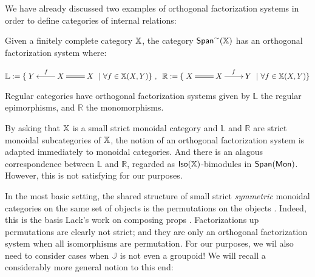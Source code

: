 We have already discussed two examples of orthogonal factorization systems in order to define categories of internal relations:

\begin{example}
Given a finitely complete category $\mathbb{X}$, the category $\mathsf{Span}^\sim(\mathbb{X})$ has an orthogonal factorization system where:

$$\mathbb{L}:=
\{\xymatrix{Y & X \ar@{=}[r] \ar[l]_{f } & X}    \  | \ \forall f \in \X(X,Y)  \}\ , \hspace*{.2cm}
\mathbb{R}:=
\{ \xymatrix{X & X \ar@{=}[l] \ar[r]^{f } & Y}    \  | \ \forall f \in \X(X,Y) \}
$$

\end{example}


\begin{example}
Regular categories have orthogonal factorization systems given by $\mathbb{L}$ the regular epimorphisms, and $\mathbb R$ the monomorphisms.
\end{example}



By asking that $\mathbb{X}$ is a small strict monoidal category and  $\mathbb{L}$ and $\mathbb{R}$ are strict monoidal subcategories of $\mathbb{X}$, the notion of an orthogonal factorization system is adapted immediately to monoidal categories. And there is an alagous correspondence  between $\mathbb{L}$ and $\mathbb{R}$, regarded as ${\sf Iso}(\mathbb{X})$-bimodules in $\mathsf{Span}({\sf Mon})$.  However, this is not satisfying for our purposes.

 In the most basic setting, the shared structure of small strict {\em symmetric} monoidal categories on the same set of objects is the permutations on the objects .  Indeed, this is the basis Lack's work on composing props \cite{lack}. Factorizations up permutations are clearly not strict; and they are only an orthogonal factorization system when all isomorphisms are permutation.  For our purposes, we wil also need to consider cases when $\mathbb J$ is not even a groupoid!  We will recall a considerably more general notion to this end:

